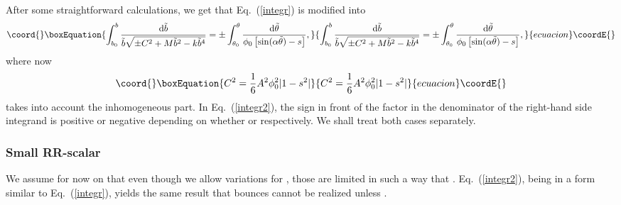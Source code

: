 \documentclass[a4paper,aps,twocolumn,prd,showpacs,nofootinbib]{revtex4}
\providecommand{\dd}{\mathrm{d}}
\begin{document}
After some straightforward calculations, we get that
Eq.~(\ref{integr}) is modified into
\begin{equation}\coord{}\boxEquation{
\int_{b_0}^{b} {\dd \tilde b \over \tilde b \sqrt{\pm C^2 + M \tilde
b^2 - k \tilde b^4}} = \pm \int_{\theta_0}^\theta {\dd \tilde
\theta\over \phi_0 \left[\sin(\alpha\tilde\theta)-s\right]},
\label{integr2}
}{
\int_{b_0}^{b} {\dd \tilde b \over \tilde b \sqrt{\pm C^2 + M \tilde
b^2 - k \tilde b^4}} = \pm \int_{\theta_0}^\theta {\dd \tilde
\theta\over \phi_0 \left[\sin(\alpha\tilde\theta)-s\right]},
}{ecuacion}\coordE{}\end{equation}
where now
\begin{equation}\coord{}\boxEquation{
C^2 = \frac{1}{6}A^2\phi_0^2 |1 - s^2| \label{Cs}
}{
C^2 = \frac{1}{6}A^2\phi_0^2 |1 - s^2| }{ecuacion}\coordE{}\end{equation}
takes into account the inhomogeneous part. In Eq.~(\ref{integr2}), the
sign in front of the factor \coordHE{} in the denominator of the right-hand
side integrand is positive or negative depending on whether \coordHE{} or
\coordHE{} respectively. We shall treat both cases separately.

\subsubsection{Small RR-scalar}

We assume for now on that even though we allow variations for \myHighlight{$\xi$}\coordHE{},
those are limited in such a way that \coordHE{}. Eq.~(\ref{integr2}),
being in a form similar to Eq.~(\ref{integr}), yields the same result
that bounces cannot be realized unless \coordHE{}.
\end{document}

